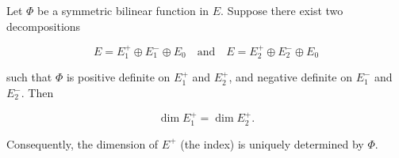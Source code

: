 Let $\Phi$ be a symmetric bilinear function in $E$. Suppose there exist two decompositions

$$E = E_1^+ \oplus E_1^- \oplus E_0 \quad \text{and} \quad E = E_2^+ \oplus E_2^- \oplus E_0$$

such that $\Phi$ is positive definite on $E_1^+$ and $E_2^+$, and negative definite on $E_1^-$ and $E_2^-$. Then

$$\dim E_1^+ = \dim E_2^+.$$

Consequently, the dimension of $E^+$ (the index) is uniquely determined by $\Phi$.

